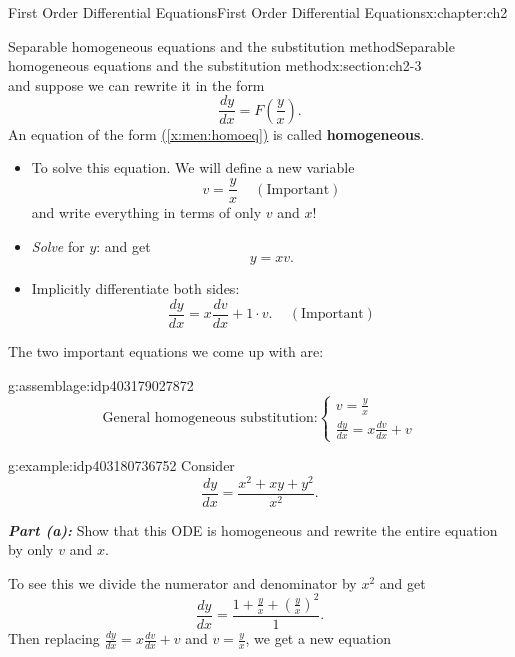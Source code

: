 \documentclass[oneside,10pt,]{book}
\newcommand{\xreffont}{\relax}
\newcommand{\alert}[1]{\textbf{\textit{#1}}}
\newcommand{\terminology}[1]{\textbf{#1}}
\numberwithin{equation}{section}
\numberwithin{equation}{section}
\begin{document}
\begin{chapterptx}{First Order Differential Equations}{}{First Order Differential Equations}{}{}{x:chapter:ch2}
\begin{sectionptx}{Separable homogeneous equations and the substitution method}{}{Separable homogeneous equations and the substitution method}{}{}{x:section:ch2-3}
\begin{equation*}
\end{equation*}
and suppose we can rewrite it in the form%
\begin{equation}
\frac{dy}{dx}=F\left(\frac{y}{x}\right).\label{x:men:homoeq}
\end{equation}
An equation of the form \hyperref[x:men:homoeq]{({\xreffont\ref{x:men:homoeq}})} is called \terminology{homogeneous}.%
%
\begin{itemize}[label=\textbullet]
\item{}To solve this equation. We will define a new variable%
\begin{equation*}
v=\frac{y}{x}\,\,\,\,\,\,\,(\text{Important})
\end{equation*}
and write everything in terms of only \(v\) and \(x\)!%
\item{}\emph{Solve} for \(y\): and get%
\begin{equation*}
y=xv.
\end{equation*}
%
\item{}Implicitly differentiate both sides:%
\begin{equation*}
\frac{dy}{dx}=x\frac{dv}{dx}+1\cdot v.\,\,\,\,\,\,\,(\text{Important})
\end{equation*}
%
\end{itemize}
The two important equations we come up with are:%
\begin{assemblage}{}{g:assemblage:idp403179027872}%
%
\begin{equation*}
\text{General homogeneous substitution:}\begin{cases}
v=\frac{y}{x}\\
\frac{dy}{dx}=x\frac{dv}{dx}+v
\end{cases}
\end{equation*}
%
\end{assemblage}
\begin{example}{}{g:example:idp403180736752}%
Consider%
\begin{equation*}
\frac{dy}{dx}=\frac{x^{2}+xy+y^{2}}{x^{2}}.
\end{equation*}
%
\par
\alert{Part (a):} Show that this ODE is homogeneous and rewrite the entire equation by only \(v\) and \(x\).%
\par
To see this we divide the numerator and denominator by \(x^{2}\) and get%
\begin{equation*}
\frac{dy}{dx}=\frac{1+\frac{y}{x}+\left(\frac{y}{x}\right)^{2}}{1}.
\end{equation*}
Then replacing \(\frac{dy}{dx}=x\frac{dv}{dx}+v\) and \(v=\frac{y}{x}\), we get a new equation%

\end{example}
\end{sectionptx}
\end{chapterptx}
\end{document}
